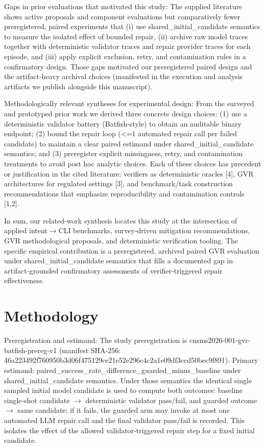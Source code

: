 \documentclass[conference]{IEEEtran}
\begin{document}
Gaps in prior evaluations that motivated this study: The supplied literature shows active proposals and component evaluations but comparatively fewer preregistered, paired experiments that (i) use shared\_initial\_candidate semantics to measure the isolated effect of bounded repair, (ii) archive raw model traces together with deterministic validator traces and repair provider traces for each episode, and (iii) apply explicit exclusion, retry, and contamination rules in a confirmatory design. Those gaps motivated our preregistered paired design and the artifact‑heavy archival choices (manifested in the execution and analysis artifacts we publish alongside this manuscript).

Methodologically relevant syntheses for experimental design: From the surveyed and prototyped prior work we derived three concrete design choices: (1) use a deterministic validator battery (Batfish‑style) to obtain an auditable binary endpoint; (2) bound the repair loop (<=1 automated repair call per failed candidate) to maintain a clear paired estimand under shared\_initial\_candidate semantics; and (3) preregister explicit missingness, retry, and contamination treatments to avoid post hoc analytic choices. Each of these choices has precedent or justification in the cited literature: verifiers as deterministic oracles [4], GVR architectures for regulated settings [3], and benchmark/task construction recommendations that emphasize reproducibility and contamination controls [1,2].

In sum, our related‑work synthesis locates this study at the intersection of applied intent\ensuremath{\rightarrow}CLI benchmarks, survey‑driven mitigation recommendations, GVR methodological proposals, and deterministic verification tooling. The specific empirical contribution is a preregistered, archived paired GVR evaluation under shared\_initial\_candidate semantics that fills a documented gap in artifact‑grounded confirmatory assessments of verifier‑triggered repair effectiveness.

\section{Methodology}
Preregistration and estimand: The study preregistration is cnsms2026-001-gvr-batfish-prereg-v1 (manifest SHA‑256: 46a22349\allowbreak{}2f760950\allowbreak{}b3d06f47\allowbreak{}5129ce21\allowbreak{}e52e296c\allowbreak{}4c2a1e09\allowbreak{}df3ccd50\allowbreak{}bec9f891). Primary estimand: paired\_success\_rate\_difference\_guarded\_minus\_baseline under shared\_initial\_candidate semantics. Under those semantics the identical single sampled initial model candidate is used to compute both outcomes: baseline single‑shot candidate \ensuremath{\rightarrow} deterministic validator pass/fail, and guarded outcome \ensuremath{\rightarrow} same candidate; if it fails, the guarded arm may invoke at most one automated LLM repair call and the final validator pass/fail is recorded. This isolates the effect of the allowed validator‑triggered repair step for a fixed initial candidate.
\end{document}
